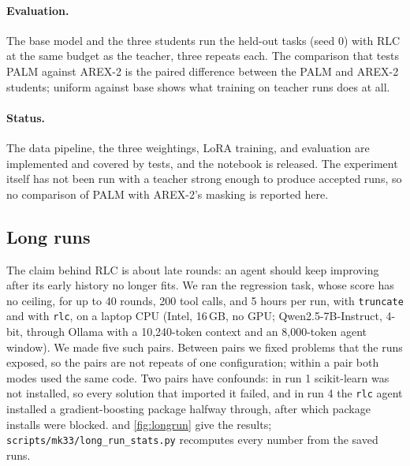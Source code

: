 \documentclass[11pt]{article}
\newcommand{\code}[1]{\texttt{#1}}
\begin{document}
\paragraph{Evaluation.} The base model and the three students run the held-out tasks (seed 0) with RLC at the same budget as the teacher, three repeats each. The comparison that tests PALM against AREX-2 is the paired difference between the PALM and AREX-2 students; uniform against base shows what training on teacher runs does at all.

\paragraph{Status.} The data pipeline, the three weightings, LoRA training, and evaluation are implemented and covered by tests, and the notebook is released. The experiment itself has not been run with a teacher strong enough to produce accepted runs, so no comparison of PALM with AREX-2's masking is reported here.

\subsection{Long runs}
\label{sec:longrun}
The claim behind RLC is about late rounds: an agent should keep improving after its early history no longer fits. We ran the regression task, whose score has no ceiling, for up to 40 rounds, 200 tool calls, and 5 hours per run, with \code{truncate} and with \code{rlc}, on a laptop CPU (Intel, 16\,GB, no GPU; Qwen2.5-7B-Instruct, 4-bit, through Ollama with a 10,240-token context and an 8,000-token agent window). We made five such pairs. Between pairs we fixed problems that the runs exposed, so the pairs are not repeats of one configuration; within a pair both modes used the same code. Two pairs have confounds: in run 1 scikit-learn was not installed, so every solution that imported it failed, and in run 4 the \code{rlc} agent installed a gradient-boosting package halfway through, after which package installs were blocked.  and \cref{fig:longrun} give the results; \code{scripts/mk33/long\_run\_stats.py} recomputes every number from the saved runs.
\end{document}
